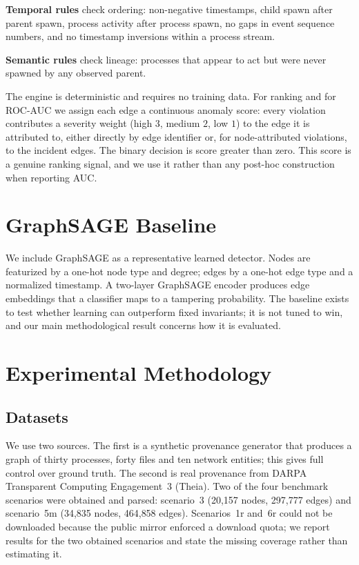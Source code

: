 \documentclass[conference]{IEEEtran}
\begin{document}
\textbf{Temporal rules} check ordering: non-negative timestamps, child spawn
after parent spawn, process activity after process spawn, no gaps in event
sequence numbers, and no timestamp inversions within a process stream.

\textbf{Semantic rules} check lineage: processes that appear to act but were
never spawned by any observed parent.

The engine is deterministic and requires no training data. For ranking and for
ROC-AUC we assign each edge a continuous anomaly score: every violation
contributes a severity weight (high $3$, medium $2$, low $1$) to the edge it is
attributed to, either directly by edge identifier or, for node-attributed
violations, to the incident edges. The binary decision is score greater than
zero. This score is a genuine ranking signal, and we use it rather than any
post-hoc construction when reporting AUC.

\section{GraphSAGE Baseline}
We include GraphSAGE as a representative learned detector. Nodes are featurized
by a one-hot node type and degree; edges by a one-hot edge type and a normalized
timestamp. A two-layer GraphSAGE encoder produces edge embeddings that a
classifier maps to a tampering probability. The baseline exists to test whether
learning can outperform fixed invariants; it is not tuned to win, and our main
methodological result concerns how it is evaluated.

\section{Experimental Methodology}
\label{sec:eval}
\subsection{Datasets}
We use two sources. The first is a synthetic provenance generator that produces
a graph of thirty processes, forty files and ten network entities; this gives
full control over ground truth. The second is real provenance from DARPA
Transparent Computing Engagement~3 (Theia). Two of the four benchmark scenarios
were obtained and parsed: scenario~3 (20{,}157 nodes, 297{,}777 edges) and
scenario~5m (34{,}835 nodes, 464{,}858 edges). Scenarios~1r and~6r could not be
downloaded because the public mirror enforced a download quota; we report
results for the two obtained scenarios and state the missing coverage rather
than estimating it.
\end{document}
